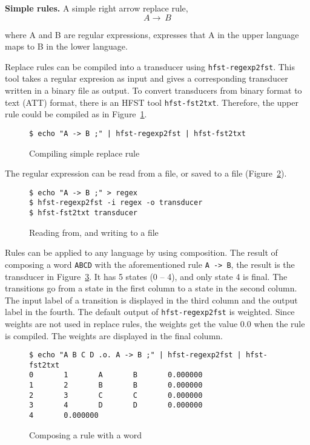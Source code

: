 \documentclass{llncs}
\begin{document}

\textbf{Simple rules.} A simple right arrow replace rule,
\begin{equation}
  A \rightarrow\ B
\end{equation}

where A and B are regular expressions, 
expresses that A in the upper language maps to B in the lower language.

Replace rules can be compiled into a transducer using
\verb!hfst-regexp2fst!. This tool takes a regular expresion as input 
and gives a corresponding transducer written in a binary file as output. 
To convert transducers from binary format to text (ATT) format, 
there is an HFST tool \verb!hfst-fst2txt!. Therefore, the upper rule 
could be compiled as in Figure~\ref{fig:simple_replace}.

\begin{figure} [h!]
{\footnotesize
\begin{verbatim}
$ echo "A -> B ;" | hfst-regexp2fst | hfst-fst2txt
\end{verbatim}
}
\caption{Compiling simple replace rule}
\label{fig:simple_replace}
\end{figure}


The regular expression can be read from a file, or saved to a file (Figure~\ref{fig:read_from_file}). 

\begin{figure} [h!]
{\footnotesize
\begin{verbatim}
$ echo "A -> B ;" > regex
$ hfst-regexp2fst -i regex -o transducer
$ hfst-fst2txt transducer
\end{verbatim}
}
\caption{Reading from, and writing to a file}
\label{fig:read_from_file}
\end{figure}


Rules can be applied to any language by using composition.
The result of composing a word \verb!ABCD! with the aforementioned rule
\verb!A -> B!, the
result is the transducer in Figure~\ref{fig:replace_compose}.  It has
5 states (0 -- 4), and only state 4 is final. The transitions go from a state in the
first column to a state in the second column. The input label of a transition is
displayed in the third column and the output label in the fourth. The default
output of \verb!hfst-regexp2fst! is weighted. Since weights are
not used in replace rules, the weights get the value 0.0 when the rule is
compiled. The weights are displayed in the final column.

\begin{figure} [h!]
{\footnotesize
\begin{verbatim}
$ echo "A B C D .o. A -> B ;" | hfst-regexp2fst | hfst-fst2txt
0       1       A       B       0.000000
1       2       B       B       0.000000
2       3       C       C       0.000000
3       4       D       D       0.000000
4       0.000000
\end{verbatim}
}
\caption{Composing a rule with a word}
\label{fig:replace_compose}
\end{figure}
\end{document}
